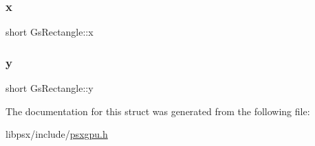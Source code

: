 \subsubsection{\texorpdfstring{x}{x}}
{\footnotesize\ttfamily short Gs\+Rectangle\+::x}

\mbox{\label{structGsRectangle_ae4ed9d3d091f0f0db713bd14eeacb760}} 
\subsubsection{\texorpdfstring{y}{y}}
{\footnotesize\ttfamily short Gs\+Rectangle\+::y}



The documentation for this struct was generated from the following file\+:\begin{DoxyCompactItemize}
\item 
libpsx/include/\hyperlink{psxgpu_8h}{psxgpu.\+h}\end{DoxyCompactItemize}
